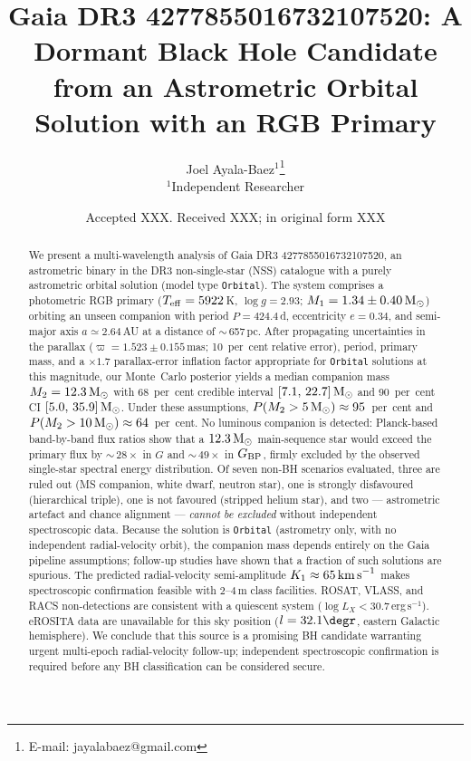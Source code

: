 \documentclass[usenatbib,fleqn]{mnras}
\title[Gaia DR3 4277855016732107520: A Dormant BH Candidate]
{Gaia DR3 4277855016732107520: A Dormant Black Hole Candidate\\
 from an Astrometric Orbital Solution with an RGB Primary}
\author[J. Ayala-Baez]{
  Joel Ayala-Baez$^{1}$\thanks{E-mail: jayalabaez@gmail.com}\\
  $^{1}$Independent Researcher
}
\date{Accepted XXX. Received XXX; in original form XXX}
\newcommand{\Msun}{{\rm M}_\odot}
\newcommand{\kms}{{\rm km\,s}^{-1}}
\begin{document}
\label{firstpage}
\pagerange{\pageref{firstpage}--\pageref{LastPage}}
\maketitle

\begin{abstract}
We present a multi-wavelength analysis of Gaia DR3
4277855016732107520, an astrometric binary in the DR3 non-single-star
(NSS) catalogue with a purely astrometric orbital solution
(model type \texttt{Orbital}).
The system comprises a photometric RGB primary
($T_{\rm eff} = 5922$\,K, $\log g = 2.93$;
$M_1 = 1.34 \pm 0.40\,\Msun$) orbiting an unseen companion with
period $P = 424.4$\,d, eccentricity $e = 0.34$, and semi-major
axis $a \simeq 2.64$\,AU at a distance of $\sim$\,657\,pc.
After propagating uncertainties in the parallax
($\varpi = 1.523 \pm 0.155$\,mas; 10~per~cent relative error),
period, primary mass, and a $\times 1.7$ parallax-error inflation
factor appropriate for \texttt{Orbital} solutions at this magnitude,
our Monte~Carlo posterior yields a median companion mass
$M_2 = 12.3\,\Msun$ with 68~per~cent credible interval
$[7.1,\,22.7]\,\Msun$ and 90~per~cent CI $[5.0,\,35.9]\,\Msun$.
Under these assumptions, $P(M_2 > 5\,\Msun) \approx 95$~per~cent
and $P(M_2 > 10\,\Msun) \approx 64$~per~cent.
No luminous companion is detected: Planck-based band-by-band flux
ratios show that a $12.3\,\Msun$ main-sequence star would exceed
the primary flux by $\sim$\,$28\times$ in $G$ and
$\sim$\,$49\times$ in $G_{\rm BP}$, firmly excluded by the observed
single-star spectral energy distribution.
Of seven non-BH scenarios evaluated, three are ruled out
(MS companion, white dwarf, neutron star), one is strongly
disfavoured (hierarchical triple), one is not favoured
(stripped helium star), and two --- astrometric artefact and
chance alignment --- \emph{cannot be excluded} without independent
spectroscopic data.  Because the solution is \texttt{Orbital}
(astrometry only, with no independent radial-velocity orbit), the
companion mass depends entirely on the Gaia pipeline assumptions;
follow-up studies have shown that a fraction of such solutions are
spurious.  The predicted radial-velocity semi-amplitude
$K_1 \approx 65\,\kms$ makes spectroscopic confirmation feasible
with $2$--$4$\,m class facilities.
ROSAT, VLASS, and RACS non-detections are consistent with a
quiescent system ($\log L_X < 30.7$\,erg\,s$^{-1}$).
eROSITA data are unavailable for this sky position
($l = 32.1\degr$, eastern Galactic hemisphere).
We conclude that this source is a promising BH candidate warranting
urgent multi-epoch radial-velocity follow-up; independent
spectroscopic confirmation is required before any BH classification
can be considered secure.
\end{abstract}
\end{document}
